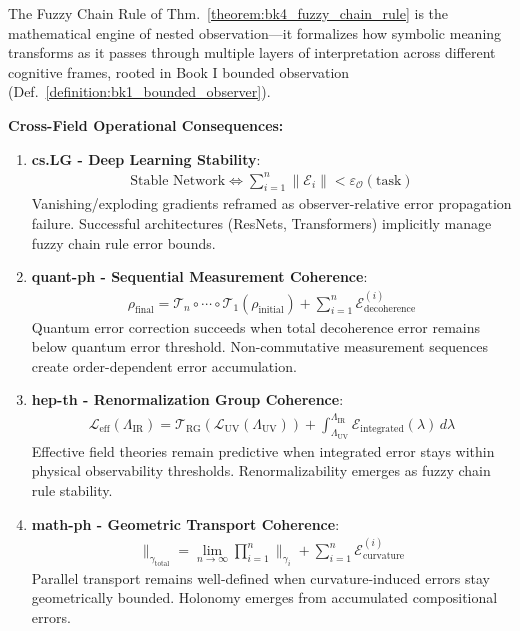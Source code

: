 \begin{scholium}
\label{scholium:bk4_nested_frames}
The Fuzzy Chain Rule of Thm.~\ref{theorem:bk4_fuzzy_chain_rule} is the mathematical engine of nested observation---it formalizes how symbolic meaning transforms as it passes through multiple layers of interpretation across different cognitive frames, rooted in Book I bounded observation (Def.~\ref{definition:bk1_bounded_observer}).

\textbf{Cross-Field Operational Consequences:}

\begin{enumerate}
\item \textbf{cs.LG - Deep Learning Stability}: 
   \begin{align}
   \text{Stable Network} \Leftrightarrow \sum_{i=1}^{n} \|\mathcal{E}_i\| < \varepsilon_{\mathcal{O}}(\text{task})
   \end{align}
   Vanishing/exploding gradients reframed as observer-relative error propagation failure. Successful architectures (ResNets, Transformers) implicitly manage fuzzy chain rule error bounds.

\item \textbf{quant-ph - Sequential Measurement Coherence}:
   \begin{align}
   \rho_{\text{final}} = \mathcal{T}_n \circ \cdots \circ \mathcal{T}_1(\rho_{\text{initial}}) + \sum_{i=1}^{n} \mathcal{E}_{\text{decoherence}}^{(i)}
   \end{align}
   Quantum error correction succeeds when total decoherence error remains below quantum error threshold. Non-commutative measurement sequences create order-dependent error accumulation.

\item \textbf{hep-th - Renormalization Group Coherence}:
   \begin{align}
   \mathcal{L}_{\text{eff}}(\Lambda_{\text{IR}}) = \mathcal{T}_{\text{RG}}(\mathcal{L}_{\text{UV}}(\Lambda_{\text{UV}})) + \int_{\Lambda_{\text{UV}}}^{\Lambda_{\text{IR}}} \mathcal{E}_{\text{integrated}}(\lambda) \, d\lambda
   \end{align}
   Effective field theories remain predictive when integrated error stays within physical observability thresholds. Renormalizability emerges as fuzzy chain rule stability.

\item \textbf{math-ph - Geometric Transport Coherence}:
   \begin{align}
   \parallel_{\gamma_{\text{total}}} = \lim_{n \to \infty} \prod_{i=1}^{n} \parallel_{\gamma_i} + \sum_{i=1}^{n} \mathcal{E}_{\text{curvature}}^{(i)}
   \end{align}
   Parallel transport remains well-defined when curvature-induced errors stay geometrically bounded. Holonomy emerges from accumulated compositional errors.


\end{enumerate}
\end{scholium}
